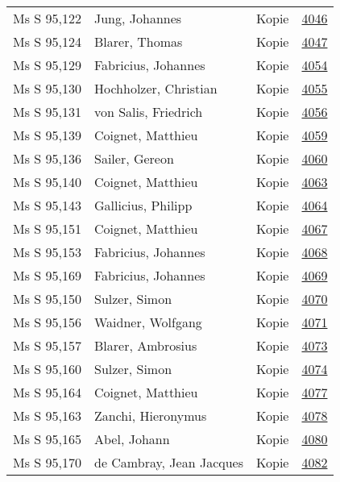 \documentclass[10pt,a4paper,landscape]{report}
\begin{document}
\begin{longtable}{p{16cm}p{4cm}lr}
Ms S 95,122	&	Jung, Johannes	&	Kopie	&	\href{http://130.60.24.72/assignment/4046}{4046}\\
Ms S 95,124	&	Blarer, Thomas	&	Kopie	&	\href{http://130.60.24.72/assignment/4047}{4047}\\
Ms S 95,129	&	Fabricius, Johannes	&	Kopie	&	\href{http://130.60.24.72/assignment/4054}{4054}\\
Ms S 95,130	&	Hochholzer, Christian	&	Kopie	&	\href{http://130.60.24.72/assignment/4055}{4055}\\
Ms S 95,131	&	von Salis, Friedrich	&	Kopie	&	\href{http://130.60.24.72/assignment/4056}{4056}\\
Ms S 95,139	&	Coignet, Matthieu	&	Kopie	&	\href{http://130.60.24.72/assignment/4059}{4059}\\
Ms S 95,136	&	Sailer, Gereon	&	Kopie	&	\href{http://130.60.24.72/assignment/4060}{4060}\\
Ms S 95,140	&	Coignet, Matthieu	&	Kopie	&	\href{http://130.60.24.72/assignment/4063}{4063}\\
Ms S 95,143	&	Gallicius, Philipp	&	Kopie	&	\href{http://130.60.24.72/assignment/4064}{4064}\\
Ms S 95,151	&	Coignet, Matthieu	&	Kopie	&	\href{http://130.60.24.72/assignment/4067}{4067}\\
Ms S 95,153	&	Fabricius, Johannes	&	Kopie	&	\href{http://130.60.24.72/assignment/4068}{4068}\\
Ms S 95,169	&	Fabricius, Johannes	&	Kopie	&	\href{http://130.60.24.72/assignment/4069}{4069}\\
Ms S 95,150	&	Sulzer, Simon	&	Kopie	&	\href{http://130.60.24.72/assignment/4070}{4070}\\
Ms S 95,156	&	Waidner, Wolfgang	&	Kopie	&	\href{http://130.60.24.72/assignment/4071}{4071}\\
Ms S 95,157	&	Blarer, Ambrosius	&	Kopie	&	\href{http://130.60.24.72/assignment/4073}{4073}\\
Ms S 95,160	&	Sulzer, Simon	&	Kopie	&	\href{http://130.60.24.72/assignment/4074}{4074}\\
Ms S 95,164	&	Coignet, Matthieu	&	Kopie	&	\href{http://130.60.24.72/assignment/4077}{4077}\\
Ms S 95,163	&	Zanchi, Hieronymus	&	Kopie	&	\href{http://130.60.24.72/assignment/4078}{4078}\\
Ms S 95,165	&	Abel, Johann	&	Kopie	&	\href{http://130.60.24.72/assignment/4080}{4080}\\
Ms S 95,170	&	de Cambray, Jean Jacques	&	Kopie	&	\href{http://130.60.24.72/assignment/4082}{4082}\\

\end{longtable}
\end{document}
